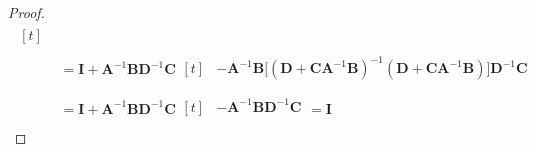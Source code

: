 \begin{proof}
\begin{equation*}
\begin{aligned}
\begin{aligned}[t]
        \end{aligned} \\
        &= \boldsymbol I + \boldsymbol A^{-1}\boldsymbol B\boldsymbol D^{-1}\boldsymbol C \begin{aligned}[t] 
            &-\boldsymbol A^{-1}\boldsymbol B\Big[(\boldsymbol D+\boldsymbol C\boldsymbol A^{-1}\boldsymbol B)^{-1} (\boldsymbol D + \boldsymbol C\boldsymbol A^{-1}\boldsymbol B) \Big]\boldsymbol D^{-1}\boldsymbol C\\
        \end{aligned} \\
        &= \boldsymbol I + \boldsymbol A^{-1}\boldsymbol B\boldsymbol D^{-1}\boldsymbol C \begin{aligned}[t] 
            &-\boldsymbol A^{-1}\boldsymbol B\boldsymbol D^{-1}\boldsymbol C\\
        \end{aligned} = \boldsymbol I
    \end{aligned}
    \end{equation*}
\end{proof}

